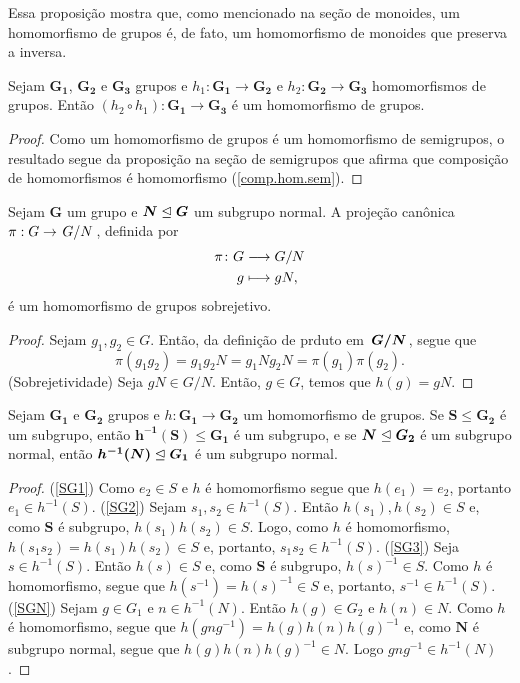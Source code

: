 	Essa proposição mostra que, como mencionado na seção de monoides, um homomorfismo de grupos é, de fato, um homomorfismo de monoides que preserva a inversa.

\begin{proposition}
\label{comp.hom.gru}
Sejam $\bm{G_1}$, $\bm{G_2}$ e $\bm{G_3}$ grupos e $h_1: \bm{G_1} \to \bm{G_2}$ e $h_2: \bm{G_2} \to \bm{G_3}$ homomorfismos de grupos. Então $(h_2 \circ h_1): \bm{G_1} \to \bm{G_3}$ é um homomorfismo de grupos.
\end{proposition}
\begin{proof}
Como um homomorfismo de grupos é um homomorfismo de semigrupos, o resultado segue da proposição na seção de semigrupos que afirma que composição de homomorfismos é homomorfismo (\ref{comp.hom.sem}).
\end{proof}

\begin{proposition}
Sejam $\bm G$ um grupo e $\bm N \mathrel{\unlhd} \bm G$ um subgrupo normal. A projeção canônica $\pi: G \to \quo{G}{N}$, definida por
	\begin{align*}
	{\pi}\colon {G} &\longrightarrow {G/N} \\{g} &\longmapsto gN,
	\end{align*}
é um homomorfismo de grupos sobrejetivo.
\end{proposition}
\begin{proof}
Sejam $g_1,g_2 \in G$. Então, da definição de prduto em $\bm{\quo{G}{N}}$, segue que
	\begin{equation*}
	\pi(g_1g_2) = g_1g_2N = g_1Ng_2N = \pi(g_1)\pi(g_2).
	\end{equation*}
(Sobrejetividade) Seja $gN \in G/N$. Então, $g \in G$, temos que $h(g)=gN$.
\end{proof}

\begin{proposition}
\label{alge:prop.gru.hominv}
Sejam $\bm{G_1}$ e $\bm{G_2}$ grupos e $h: \bm{G_1} \to \bm{G_2}$ um homomorfismo de grupos. Se $\bm S \leq \bm{G_2}$ é um subgrupo, então $\bm{h^{-1}(S)} \leq \bm{G_1}$ é um subgrupo, e se $\bm N \mathrel{\unlhd} \bm{G_2}$ é um subgrupo normal, então $\bm{h^{-1}(N)} \mathrel{\unlhd} \bm{G_1}$ é um subgrupo normal.
\end{proposition}
\begin{proof}
(\ref{SG1}) Como $e_2 \in S$ e $h$ é homomorfismo segue que $h(e_1)=e_2$, portanto $e_1 \in h^{-1}(S)$.
(\ref{SG2}) Sejam $s_1,s_2 \in h^{-1}(S)$. Então $h(s_1),h(s_2) \in S$ e, como $\bm S$ é subgrupo, $h(s_1)h(s_2) \in S$. Logo, como $h$ é homomorfismo, $h(s_1s_2) = h(s_1)h(s_2) \in S$ e, portanto, $s_1s_2 \in h^{-1}(S)$.
(\ref{SG3}) Seja $s \in h^{-1}(S)$. Então $h(s) \in S$ e, como $\bm S$ é subgrupo, $h(s)^{-1} \in S$. Como $h$ é homomorfismo, segue que $h(s^{-1})=h(s)^{-1} \in S$ e, portanto, $s^{-1} \in h^{-1}(S)$.  
(\ref{SGN}) Sejam $g \in G_1$ e $n \in h^{-1}(N)$. Então $h(g) \in G_2$ e $h(n) \in N$. Como $h$ é homomorfismo, segue que $h(gng^{-1})=h(g)h(n)h(g)^{-1}$ e, como $\bm N$ é subgrupo normal, segue que $h(g)h(n)h(g)^{-1} \in N$. Logo $gng^{-1} \in h^{-1}(N)$.
\end{proof}

